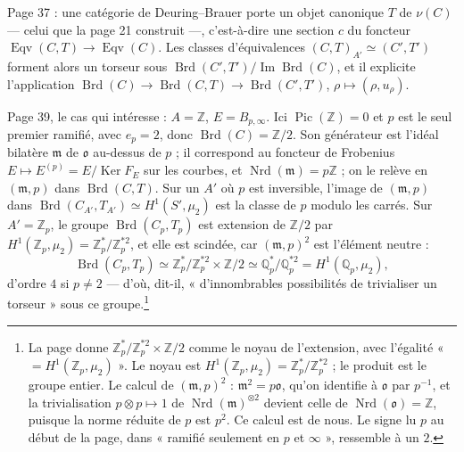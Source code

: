\documentclass[11pt,a4paper]{article}
\begin{document}
Page 37 : une catégorie de Deuring--Brauer porte un objet canonique $T$ de
$\nu(C)$ --- celui que la page 21 construit ---, c'est-à-dire une section $c$
du foncteur $\operatorname{Eqv}(C, T) \to \operatorname{Eqv}(C)$. Les classes
d'équivalences $(C, T)_{A'} \simeq (C', T')$ forment alors un torseur sous
$\operatorname{Brd}(C', T')/\operatorname{Im}\operatorname{Brd}(C)$, et il
explicite l'application $\operatorname{Brd}(C) \to \operatorname{Brd}(C, T) \to
\operatorname{Brd}(C', T')$, $\rho \mapsto (\rho, u_{\rho})$.

Page 39, le cas qui intéresse : $A = \mathbb{Z}$, $E = B_{p,\infty}$. Ici
$\operatorname{Pic}(\mathbb{Z}) = 0$ et $p$ est le seul premier ramifié, avec
$e_{p} = 2$, donc $\operatorname{Brd}(C) = \mathbb{Z}/2$. Son générateur est
l'idéal bilatère $\mathfrak{m}$ de $\mathfrak{o}$ au-dessus de $p$ ; il
correspond au foncteur de Frobenius $E \mapsto E^{(p)} = E/\operatorname{Ker}
F_{E}$ sur les courbes, et $\operatorname{Nrd}(\mathfrak{m}) = p\mathbb{Z}$ ; on
le relève en $(\mathfrak{m}, p)$ dans $\operatorname{Brd}(C, T)$. Sur un $A'$ où
$p$ est inversible, l'image de $(\mathfrak{m}, p)$ dans
$\operatorname{Brd}(C_{A'}, T_{A'}) \simeq H^{1}(S', \mu_{2})$ est la classe de
$p$ modulo les carrés. Sur $A' = \mathbb{Z}_{p}$, le groupe
$\operatorname{Brd}(C_{p}, T_{p})$ est extension de $\mathbb{Z}/2$ par
$H^{1}(\mathbb{Z}_{p}, \mu_{2}) = \mathbb{Z}_{p}^{*}/\mathbb{Z}_{p}^{*2}$, et
elle est scindée, car $(\mathfrak{m}, p)^{2}$ est l'élément neutre :
\[
  \operatorname{Brd}(C_{p}, T_{p}) \simeq \mathbb{Z}_{p}^{*}/\mathbb{Z}_{p}^{*2}
  \times \mathbb{Z}/2 \simeq \mathbb{Q}_{p}^{*}/\mathbb{Q}_{p}^{*2} =
  H^{1}(\mathbb{Q}_{p}, \mu_{2}) ,
\]
d'ordre $4$ si $p \neq 2$ --- d'où, dit-il, « d'innombrables possibilités de
trivialiser un torseur » sous ce groupe.\footnote{La page donne
$\mathbb{Z}_{p}^{*}/\mathbb{Z}_{p}^{*2} \times \mathbb{Z}/2$ comme le noyau de
l'extension, avec l'égalité « $= H^{1}(\mathbb{Z}_{p}, \mu_{2})$ ». Le noyau est
$H^{1}(\mathbb{Z}_{p}, \mu_{2}) = \mathbb{Z}_{p}^{*}/\mathbb{Z}_{p}^{*2}$ ; le
produit est le groupe entier. Le calcul de $(\mathfrak{m}, p)^{2}$ :
$\mathfrak{m}^{2} = p\mathfrak{o}$, qu'on identifie à $\mathfrak{o}$ par $p^{-1}$,
et la trivialisation $p \otimes p \mapsto 1$ de
$\operatorname{Nrd}(\mathfrak{m})^{\otimes 2}$ devient celle de
$\operatorname{Nrd}(\mathfrak{o}) = \mathbb{Z}$, puisque la norme réduite de $p$
est $p^{2}$. Ce calcul est de nous. Le signe lu $p$ au début de la page, dans
« ramifié seulement en $p$ et $\infty$ », ressemble à un $2$.}
\end{document}
